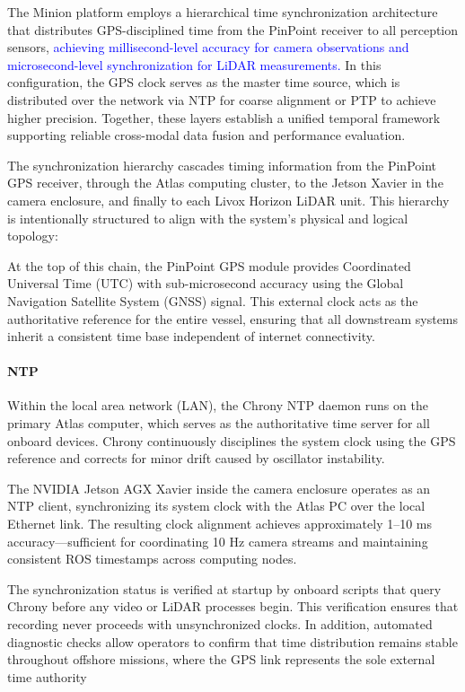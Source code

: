 \documentclass{erauthesis}
\begin{document}
The Minion platform employs a hierarchical time synchronization architecture that distributes GPS-disciplined time from the PinPoint receiver to all perception sensors, \textcolor{blue}{achieving millisecond-level accuracy for camera observations and microsecond-level synchronization for LiDAR measurements. } 
In this configuration, the GPS clock serves as the master time source, which is distributed over the network via \ac{NTP} for coarse alignment or \ac{PTP} to achieve higher precision.
Together, these layers establish a unified temporal framework supporting reliable cross-modal data fusion and performance evaluation.

The synchronization hierarchy cascades timing information from the PinPoint GPS receiver, through the Atlas computing cluster, to the Jetson Xavier in the camera enclosure, and finally to each Livox Horizon LiDAR unit. This hierarchy is intentionally structured to align with the system’s physical and logical topology:


At the top of this chain, the PinPoint GPS module provides Coordinated Universal Time (UTC) with sub-microsecond accuracy using the Global Navigation Satellite System (GNSS) signal. This external clock acts as the authoritative reference for the entire vessel, ensuring that all downstream systems inherit a consistent time base independent of internet connectivity.

\paragraph{NTP}
Within the local area network (LAN), the Chrony \ac{NTP} daemon runs on the primary Atlas computer, which serves as the authoritative time server for all onboard devices. Chrony continuously disciplines the system clock using the GPS reference and corrects for minor drift caused by oscillator instability.

The NVIDIA Jetson AGX Xavier inside the camera enclosure operates as an \ac{NTP} client, synchronizing its system clock with the Atlas PC over the local Ethernet link. The resulting clock alignment achieves approximately 1–10 ms accuracy—sufficient for coordinating 10 Hz camera streams and maintaining consistent ROS timestamps across computing nodes.

The synchronization status is verified at startup by onboard scripts that query Chrony before any video or LiDAR processes begin. This verification ensures that recording never proceeds with unsynchronized clocks. In addition, automated diagnostic checks allow operators to confirm that time distribution remains stable throughout offshore missions, where the GPS link represents the sole external time authority
\end{document}
